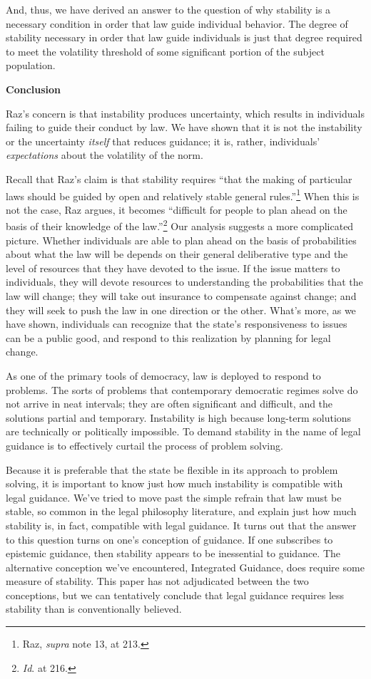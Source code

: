 And, thus, we have derived an answer to the question of why stability is
a necessary condition in order that law guide individual behavior. The
degree of stability necessary in order that law guide individuals is
just that degree required to meet the volatility threshold of some
significant portion of the subject population.

\textbf{Conclusion}

Raz's concern is that instability produces uncertainty, which results in
individuals failing to guide their conduct by law. We have shown that it
is not the instability or the uncertainty \emph{itself} that reduces
guidance; it is, rather, individuals' \emph{expectations} about the
volatility of the norm.

Recall that Raz's claim is that stability requires ``that the making of
particular laws should be guided by open and relatively stable general
rules.''\footnote{Raz, \emph{supra} note 13, at 213.} When this is not
the case, Raz argues, it becomes ``difficult for people to plan ahead on
the basis of their knowledge of the law.''\footnote{\emph{Id}. at 216.}
Our analysis suggests a more complicated picture. Whether individuals
are able to plan ahead on the basis of probabilities about what the law
will be depends on their general deliberative type and the level of
resources that they have devoted to the issue. If the issue matters to
individuals, they will devote resources to understanding the
probabilities that the law will change; they will take out insurance to
compensate against change; and they will seek to push the law in one
direction or the other. What's more, as we have shown, individuals can
recognize that the state's responsiveness to issues can be a public
good, and respond to this realization by planning for legal change.

As one of the primary tools of democracy, law is deployed to respond to
problems. The sorts of problems that contemporary democratic regimes
solve do not arrive in neat intervals; they are often significant and
difficult, and the solutions partial and temporary. Instability is high
because long-term solutions are technically or politically impossible.
To demand stability in the name of legal guidance is to effectively
curtail the process of problem solving.

Because it is preferable that the state be flexible in its approach to
problem solving, it is important to know just how much instability is
compatible with legal guidance. We've tried to move past the simple
refrain that law must be stable, so common in the legal philosophy
literature, and explain just how much stability is, in fact, compatible
with legal guidance. It turns out that the answer to this question turns
on one's conception of guidance. If one subscribes to epistemic
guidance, then stability appears to be inessential to guidance. The
alternative conception we've encountered, Integrated Guidance, does
require some measure of stability. This paper has not adjudicated
between the two conceptions, but we can tentatively conclude that legal
guidance requires less stability than is conventionally believed.
